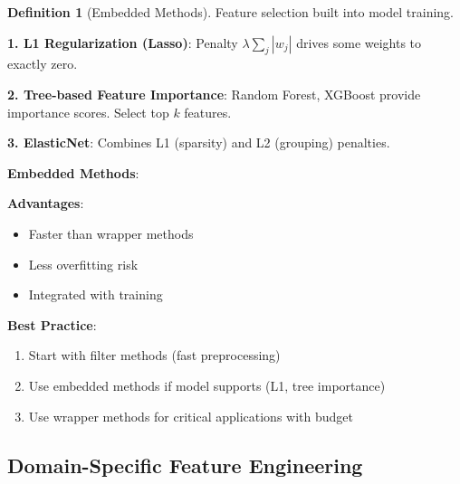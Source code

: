 \documentclass[11pt,twoside]{article}
\numberwithin{equation}{section}
\theoremstyle{plain}
\theoremstyle{definition}
\newtheorem{definition}[theorem]{Definition}
\theoremstyle{remark}
\newenvironment{keyidea}{
  \begin{tcolorbox}[colback=yellow!5!white,
                    colframe=yellow!50!black,
                    title=Key Idea,
                    breakable,
                    enhanced,
                    sharp corners,
                    boxrule=0.8pt,
                    left=6pt, right=6pt, top=6pt, bottom=6pt]
}{
  \end{tcolorbox}
}
\begin{document}
\begin{definition}[Embedded Methods]
Feature selection built into model training.

\textbf{1. L1 Regularization (Lasso)}:
Penalty $\lambda\sum_j |w_j|$ drives some weights to exactly zero.

\textbf{2. Tree-based Feature Importance}:
Random Forest, XGBoost provide importance scores. Select top $k$ features.

\textbf{3. ElasticNet}:
Combines L1 (sparsity) and L2 (grouping) penalties.
\end{definition}

\begin{keyidea}
\textbf{Embedded Methods}:

\textbf{Advantages}:
\begin{itemize}
\item Faster than wrapper methods
\item Less overfitting risk
\item Integrated with training
\end{itemize}

\textbf{Best Practice}:
\begin{enumerate}
\item Start with filter methods (fast preprocessing)
\item Use embedded methods if model supports (L1, tree importance)
\item Use wrapper methods for critical applications with budget
\end{enumerate}
\end{keyidea}

\subsection{Domain-Specific Feature Engineering}
\end{document}
